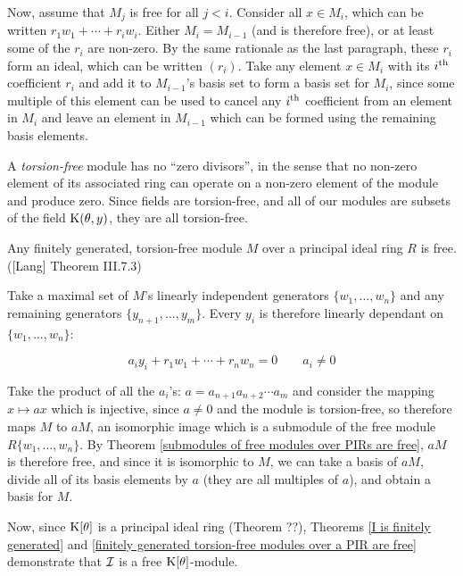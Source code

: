 Now, assume that $M_j$ is free for all $j<i$.  Consider all $x \in
M_i$, which can be written $r_1 w_1 + \cdots + r_i w_i$.  Either $M_i
= M_{i-1}$ (and is therefore free), or at least some of the $r_i$ are
non-zero.  By the same rationale as the last paragraph, these $r_i$
form an ideal, which can be written $(r_i)$.  Take any element $x \in
M_i$ with its $i^{\rm th}$ coefficient $r_i$ and add it to
$M_{i-1}$'s basis set to form a basis set for $M_i$, since some
multiple of this element can be used to cancel any $i^{\rm th}$
coefficient from an element in $M_i$ and leave an element in $M_{i-1}$
which can be formed using the remaining basis elements.

\endtheorem

A {\it torsion-free} module has no ``zero divisors'', in the sense
that no non-zero element of its associated ring can operate on a
non-zero element of the module and produce zero.  Since fields are
torsion-free, and all of our modules are subsets of the field
${\rm K}(\theta,y)$, they are all torsion-free.

\theorem
\label{finitely generated torsion-free modules over a PIR are free}

Any finitely generated, torsion-free module $M$ over a principal ideal
ring $R$ is free. ([Lang] Theorem III.7.3)

\proof

Take a maximal set of $M$'s linearly independent generators $\{w_1,
\ldots, w_n\}$ and any remaining generators $\{y_{n+1}, \ldots,
y_m\}$.  Every $y_i$ is therefore linearly dependant on $\{w_1,
\ldots, w_n\}$:

$$a_i y_i + r_1 w_1 + \cdots + r_n w_n = 0 \qquad a_i \ne 0$$

Take the product of all the $a_i$'s: $a = a_{n+1} a_{n+2} \cdots a_m$
and consider the mapping $x \mapsto ax$ which is injective, since $a
\ne 0$ and the module is torsion-free, so therefore maps $M$ to $aM$,
an isomorphic image which is a submodule of the free module
$R\{w_1,\ldots,w_n\}$.  By Theorem \ref{submodules of free modules
over PIRs are free}, $aM$ is therefore free, and since it is
isomorphic to $M$, we can take a basis of $aM$, divide all of its
basis elements by $a$ (they are all multiples of $a$), and obtain
a basis for $M$.

\endtheorem

Now, since ${\rm K}[\theta]$ is a principal ideal ring (Theorem ??),
Theorems \ref{I is finitely generated} and \ref{finitely generated
torsion-free modules over a PIR are free} demonstrate that ${\cal I}$
is a free ${\rm K}[\theta]$-module.

